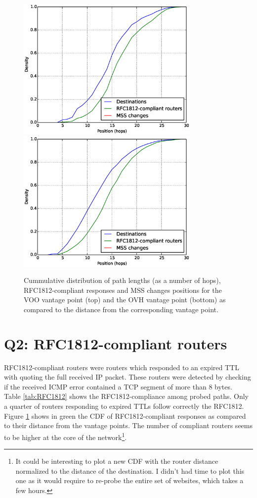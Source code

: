\documentclass[journal]{IEEEtran}
\begin{document}
\begin{figure}[!t]
    \centering
    \includegraphics[width=3.5in]{cdf_voo}
    \includegraphics[width=3.5in]{cdf_ovh}
    \caption{Cummulative distribution of path lengths (as a number of hops), RFC1812-compliant responses and MSS changes positions for the VOO vantage point (top) and the OVH vantage point (bottom) as compared to the distance from the corresponding vantage point.}
    \label{fig:cdf}
\end{figure}

\section{Q2: RFC1812-compliant routers}

RFC1812-compliant routers were routers which responded to an expired TTL with quoting the full received IP packet. These routers were detected by checking if the received ICMP error contained a TCP segment of more than 8 bytes. \\
Table \ref{tab:RFC1812} shows the RFC1812-compliance among probed paths. Only a quarter of routers responding to expired TTLs follow correctly the RFC1812. \\
Figure \ref{fig:cdf} shows in green the CDF of RFC1812-compliant responses as compared to their distance from the vantage points. The number of compliant routers seems to be higher at the core of the network\footnote{It could be interesting to plot a new CDF with the router distance normalized to the distance of the destination. I didn't had time to plot this one as it would require to re-probe the entire set of websites, which takes a few hours.}.
\end{document}
